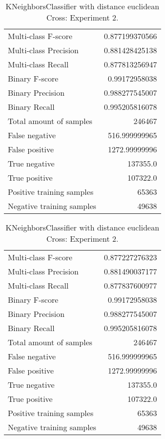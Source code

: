 \begin{table}[H]
\begin{minipage}{0.5\textwidth}
\caption{KNeighborsClassifier with distance euclidean Cross: Experiment 1.}
\centering
\begin{tabular}{l r}
\toprule
Multi-class F-score & 0.877199370566 \\
Multi-class Precision & 0.881428425138 \\
Multi-class Recall & 0.877813256947 \\
\midrule
Binary F-score & 0.99172958038 \\
Binary Precision & 0.988277545007 \\
Binary Recall & 0.995205816078 \\
\midrule
Total amount of samples & 246467 \\
False negative & 516.999999965 \\
False positive & 1272.99999996 \\
True negative & 137355.0 \\
True positive & 107322.0 \\
\midrule
Positive training samples & 65363 \\
Negative training samples & 49638 \\
\bottomrule
\end{tabular}
\end{minipage}
\hfillx
\begin{minipage}{0.5\textwidth}
\caption{KNeighborsClassifier with distance euclidean Cross: Experiment 2.}
\centering
\begin{tabular}{l r}
\toprule
Multi-class F-score & 0.877227276323 \\
Multi-class Precision & 0.881490037177 \\
Multi-class Recall & 0.877837600977 \\
\midrule
Binary F-score & 0.99172958038 \\
Binary Precision & 0.988277545007 \\
Binary Recall & 0.995205816078 \\
\midrule
Total amount of samples & 246467 \\
False negative & 516.999999965 \\
False positive & 1272.99999996 \\
True negative & 137355.0 \\
True positive & 107322.0 \\
\midrule
Positive training samples & 65363 \\
Negative training samples & 49638 \\
\bottomrule
\end{tabular}
\end{minipage}
\end{table}
